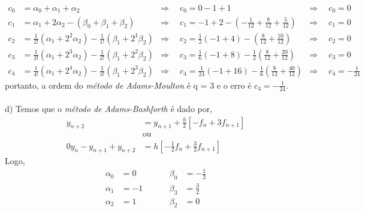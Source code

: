 \documentclass[a4paper,12pt]{article}
\begin{document}
	\begin{align*}
		c_{0} &= \alpha_{0} + \alpha_{1} + \alpha_{2} &\Rightarrow \hspace{6pt} &c_{0} = 0 -1 + 1 &\Rightarrow
		\hspace{2pt} &c_{0} =
		0\\
		c_{1} &= \alpha_{1} + 2\alpha_{2} -(\beta_{0} + \beta_{1} + \beta_{2}) &\Rightarrow \hspace{6pt} &c_{1} = -1 +
		2 - (-\frac{1}{12} + \frac{8}{12} + \frac{5}{12}) &\Rightarrow \hspace{2pt} &c_{1} = 0\\
		c_{2} &= \frac{1}{2!}(\alpha_{1} + 2^{2}\alpha_{2}) - \frac{1}{1!}(\beta_{1} + 2^{1}\beta_{2}) &\Rightarrow
		\hspace{6pt} &c_{2} = \frac{1}{2}(-1 + 4)-(\frac{8}{12} + \frac{10}{12}) &\Rightarrow \hspace{6pt} &c_{2} = 0 \\
		c_{3} &= \frac{1}{3!}(\alpha_{1} + 2^{3}\alpha_{2}) - \frac{1}{2!}(\beta_{1} + 2^{2}\beta_{2}) &\Rightarrow
		\hspace{6pt} &c_{3} = \frac{1}{6}(-1 + 8)-\frac{1}{2}(\frac{8}{12} + \frac{20}{12}) &\Rightarrow \hspace{6pt} &c_{3} = 0\\
		c_{4} &= \frac{1}{4!}(\alpha_{1} + 2^{4}\alpha_{2}) - \frac{1}{3!}(\beta_{1} + 2^{3}\beta_{2}) &\Rightarrow
		\hspace{6pt} &c_{4} = \frac{1}{24}(-1 + 16)-\frac{1}{6}(\frac{8}{12} + \frac{40}{12}) &\Rightarrow \hspace{6pt}
		&c_{4} = -\frac{1}{24}
	\end{align*}
portanto, a ordem do \textit{m\'etodo de Adams-Moulton} \'e q = 3 e o erro \'e $c_{4} = -\frac{1}{24}.$
\\ \\
d) Temos que o \textit{m\'etodo de Adams-Bashforth} \'e dado por,
	\begin{align*}
		y_{n+2} &= y_{n+1} + \frac{h}{2}[-f_{n} + 3f_{n+1}]\\
		&\mbox{ou} \\
		0y_{n} - y_{n+1} + y_{n+2} &= h[-\frac{1}{2}f_{n} + \frac{3}{2}f_{n+1}]
	\end{align*} 
Logo,
	\begin{align*}
		\alpha_{0} &=  0 \hspace{1cm}& \beta_{0} &= -\frac{1}{2}\\
		\alpha_{1} &= -1 \hspace{1cm}& \beta_{3} &= \frac{3}{2}\\
		\alpha_{2} &=  1 \hspace{1cm}& \beta_{2} &= 0
	\end{align*}
\end{document}
